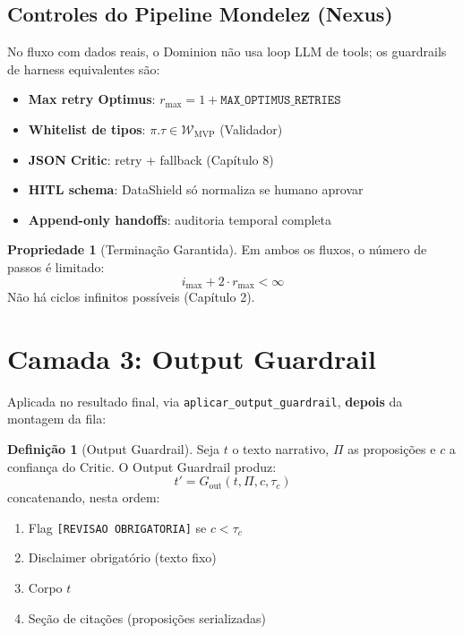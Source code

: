 \documentclass[a4paper, 12pt]{report}
\theoremstyle{definition}
\newtheorem{definicao}{Defini\c{c}\~ao}[chapter]
\newtheorem{propriedade}{Propriedade}[chapter]
\theoremstyle{remark}
\begin{document}
\subsection{Controles do Pipeline Mondelez (Nexus)}

No fluxo com dados reais, o Dominion n\~ao usa loop LLM de tools;
os guardrails de harness equivalentes s\~ao:

\begin{itemize}
  \item \textbf{Max retry Optimus}: $r_{\max} = 1 + \texttt{MAX\_OPTIMUS\_RETRIES}$
  \item \textbf{Whitelist de tipos}: $\pi.\tau \in \mathcal{W}_{\text{MVP}}$ (Validador)
  \item \textbf{JSON Critic}: retry + fallback (Cap\'itulo 8)
  \item \textbf{HITL schema}: DataShield s\'o normaliza se humano aprovar
  \item \textbf{Append-only handoffs}: auditoria temporal completa
\end{itemize}

\begin{propriedade}[Termina\c{c}\~ao Garantida]
  Em ambos os fluxos, o n\'umero de passos \'e limitado:
  \[
    i_{\max} + 2 \cdot r_{\max} < \infty
  \]
  N\~ao h\'a ciclos infinitos poss\'iveis (Cap\'itulo 2).
\end{propriedade}


\section{Camada 3: Output Guardrail}

Aplicada no resultado final, via \texttt{aplicar\_output\_guardrail},
\textbf{depois} da montagem da fila:

\begin{definicao}[Output Guardrail]
  Seja $t$ o texto narrativo, $\Pi$ as proposi\c{c}\~oes e $c$ a confian\c{c}a
  do Critic. O Output Guardrail produz:
  \[
    t' = G_{\text{out}}(t, \Pi, c, \tau_c)
  \]
  concatenando, nesta ordem:
  \begin{enumerate}
    \item Flag \texttt{[REVISAO OBRIGATORIA]} se $c < \tau_c$
    \item Disclaimer obrigat\'orio (texto fixo)
    \item Corpo $t$
    \item Se\c{c}\~ao de cita\c{c}\~oes (proposi\c{c}\~oes serializadas)
  \end{enumerate}
\end{definicao}
\end{document}
